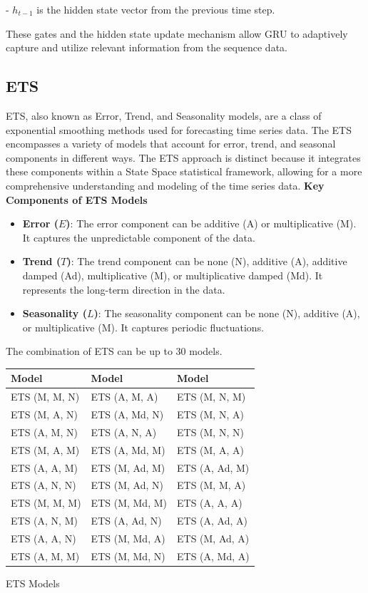 \documentclass{ieeeojies}
\begin{document}
- \( h_{t-1} \) is the hidden state vector from the previous time step.

These gates and the hidden state update mechanism allow GRU to adaptively capture and utilize relevant information from the sequence data.
\subsection{ETS}
ETS, also known as Error, Trend, and Seasonality models, are a class of exponential smoothing methods used for forecasting time series data. The ETS encompasses a variety of models that account for error, trend, and seasonal components in different ways. The ETS approach is distinct because it integrates these components within a State Space statistical framework, allowing for a more comprehensive understanding and modeling of the time series data. 
\textbf{Key Components of ETS Models}
\begin{itemize}
    \item \textbf{Error ($E$)}:  The error component can be additive (A) or multiplicative (M). It captures the unpredictable component of the data.
    \item \textbf{Trend ($T$)}: The trend component can be none (N), additive (A), additive damped (Ad), multiplicative (M), or multiplicative damped (Md). It represents the long-term direction in the data.
    \item \textbf{Seasonality ($L$)}: The seasonality component can be none (N), additive (A), or multiplicative (M). It captures periodic fluctuations. \cite{b8, b9}
\end{itemize}
The combination of ETS can be up to 30 models.


\begin{tabular}{@{}lll@{}}
\toprule
\textbf{Model} & \textbf{Model} & \textbf{Model} \\
\midrule
ETS (M, M, N) & ETS (A, M, A) & ETS (M, N, M) \\
ETS (M, A, N) & ETS (A, Md, N) & ETS (M, N, A) \\
ETS (A, M, N) & ETS (A, N, A) & ETS (M, N, N) \\
ETS (M, A, M) & ETS (A, Md, M) & ETS (M, A, A) \\
ETS (A, A, M) & ETS (M, Ad, M) & ETS (A, Ad, M) \\
ETS (A, N, N) & ETS (M, Ad, N) & ETS (M, M, A) \\
ETS (M, M, M) & ETS (M, Md, M) & ETS (A, A, A) \\
ETS (A, N, M) & ETS (A, Ad, N) & ETS (A, Ad, A) \\
ETS (A, A, N) & ETS (M, Md, A) & ETS (M, Ad, A) \\
ETS (A, M, M) & ETS (M, Md, N) & ETS (A, Md, A) \\
\bottomrule
\end{tabular}
\caption{ETS Models}
\end{document}
